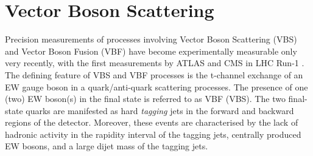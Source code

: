 
\section{Vector Boson Scattering}\label{sec:vbs}

Precision measurements of processes involving Vector Boson Scattering (VBS) and Vector Boson Fusion (VBF) have become experimentally measurable only very recently, with the first measurements by ATLAS and CMS in LHC Run-1 \cite{VBSWy:VBS1,VBSWy:VBS2,VBSWy:VBS3,VBSWy:CMSVBSWy,VBSWy:VBS5,VBSWy:VBS6,VBSWy:VBS7}. The defining feature of VBS and VBF processes is the t-channel exchange of an EW gauge boson in a quark/anti-quark scattering processes. The presence of one (two) EW boson(s) in the final state is referred to as VBF (VBS). The two final-state quarks are manifested as hard \textit{tagging} jets in the forward and backward regions of the detector. Moreover, these events are characterised by the lack of hadronic activity in the rapidity interval of the tagging jets, centrally produced EW bosons, and a large dijet mass \mjj of the tagging jets. 

